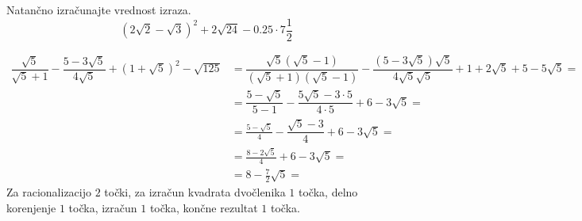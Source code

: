 \documentclass[addpoints]{exam}
\begin{document}
\begin{questions}


    \question[5]
    Natančno izračunajte vrednost izraza.
    $$ \left(2\sqrt{2}-\sqrt{3}\right)^2+2\sqrt{24}-0.25\cdot 7\frac{1}{2}$$

    \begin{solution}[7cm]
        \begin{align*} 
            \dfrac{\sqrt{5}}{\sqrt{5}+1}-\dfrac{5-3\sqrt{5}}{4\sqrt{5}}+\left(1+\sqrt{5}\right)^2-\sqrt{125}&=\dfrac{\sqrt{5}(\sqrt{5}-1)}{(\sqrt{5}+1)(\sqrt{5}-1)}-\dfrac{(5-3\sqrt{5})\sqrt{5}}{4\sqrt{5}\sqrt{5}}+1+2\sqrt{5}+5-5\sqrt{5}= \\
                                                                                                            &=\dfrac{5-\sqrt{5}}{5-1}-\dfrac{5\sqrt{5}-3\cdot 5}{4\cdot 5}+6-3\sqrt{5}= \\
                                                                                                            &=\frac{5-\sqrt{5}}{4}-\dfrac{\sqrt{5}-3}{4}+6-3\sqrt{5}= \\
                                                                                                            &=\frac{8-2\sqrt{5}}{4}+6-3\sqrt{5}= \\
                                                                                                            &=8-\frac{7}{2}\sqrt{5}= 
        \end{align*}
        Za racionalizacijo $2$ točki, za izračun kvadrata dvočlenika $1$ točka, delno korenjenje $1$ točka, izračun $1$ točka, končne rezultat $1$ točka.
    \end{solution}
    
    

    
    


\end{questions}
\end{document}

